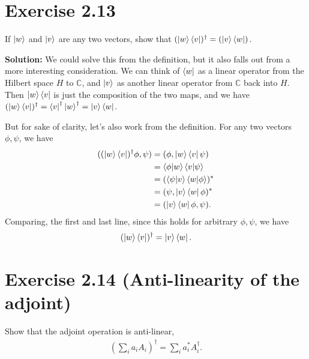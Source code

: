 \documentclass{book}
\begin{document}
\section*{Exercise 2.13}
    If $\ket{w}$ and $\ket{v}$ are any two vectors, show that $(\ket{w}\bra{v})^\dagger = (\ket{v}\bra{w})$.
    
    \textbf{Solution:} We could solve this from the definition, but it also falls out from a more interesting consideration. We can think of $\bra{w}$ as a linear operator from the Hilbert space $H$ to $\mathbb{C}$, and $\ket{v}$ as another linear operator from $\mathbb{C}$ back into $H$. Then $\ket{w}\bra{v}$ is just the composition of the two maps, and we have $(\ket{w}\bra{v})^\dagger = \bra{v}^\dagger \ket{w}^
    \dagger = \ket{v}\bra{w}$. 
    
    But for sake of clarity, let's also work from the definition. For any two vectors $\phi, \psi$, we have
    \begin{align}
    \begin{aligned}
        ((\ket{w}\bra{v})^\dagger \phi,  \psi) &=(\phi, \ket{w}\bra{v} \psi) \\ 
        &= \bra{\phi}\ket{w}\bra{v}\ket{\psi} \\
        &=(\bra{\psi}\ket{v}\bra{w}\ket{\phi})^* \\
        &= (\psi, \ket{v}\bra{w} \phi)^* \\
        &= (\ket{v}\bra{w} \phi, \psi).
    \end{aligned}
    \end{align}
    Comparing, the first and last line, since this holds for arbitrary $\phi, \psi$, we have 
    \begin{align}
        (\ket{w}\bra{v})^\dagger = \ket{v}\bra{w}.
    \end{align}
    
\section*{Exercise 2.14 (Anti-linearity of the adjoint)}
    Show that the adjoint operation is anti-linear,
    \begin{align}
        \left(\sum_i a_i A_i\right)^\dagger = \sum_i a_i^* A_i^\dagger.
    \end{align}
    
\end{document}
